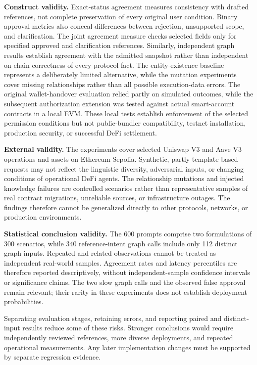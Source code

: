 \medskip\noindent\textbf{Construct validity.}
Exact-status agreement measures consistency with drafted references, not
complete preservation of every original user condition. Binary approval
metrics also conceal differences between rejection, unsupported scope, and
clarification. The joint agreement measure checks selected fields only for
specified approved and clarification references. Similarly, independent graph
results establish agreement with the admitted snapshot rather than independent
on-chain correctness of every protocol fact. The entity-existence baseline
represents a deliberately limited alternative, while the mutation experiments
cover missing relationships rather than all possible execution-data errors.
The original wallet-handover evaluation relied partly on
simulated outcomes, while the subsequent authorization extension
was tested against actual smart-account contracts in a local EVM.
These local tests establish enforcement of the selected permission
conditions but not public-bundler compatibility, testnet
installation, production security, or successful DeFi settlement.

\medskip\noindent\textbf{External validity.}
The experiments cover selected Uniswap V3 and Aave V3 operations and assets
on Ethereum Sepolia. Synthetic, partly template-based requests may not reflect
the linguistic diversity, adversarial inputs, or changing conditions of
operational DeFi agents. The relationship mutations and injected knowledge
failures are controlled scenarios rather than representative samples of real
contract migrations, unreliable sources, or infrastructure outages. The
findings therefore cannot be generalized directly to other protocols,
networks, or production environments.

\medskip\noindent\textbf{Statistical conclusion validity.}
The 600 prompts comprise two formulations of 300 scenarios, while 340
reference-intent graph calls include only 112 distinct graph inputs. Repeated
and related observations cannot be treated as independent real-world samples.
Agreement rates and latency percentiles are therefore reported descriptively,
without independent-sample confidence intervals or significance claims.
The two slow graph calls and the observed false approval remain relevant;
their rarity in these experiments does not establish deployment probabilities.

Separating evaluation stages, retaining errors, and reporting paired and
distinct-input results reduce some of these risks. Stronger conclusions would
require independently reviewed references, more diverse deployments, and
repeated operational measurements. Any later implementation changes must be
supported by separate regression evidence.

